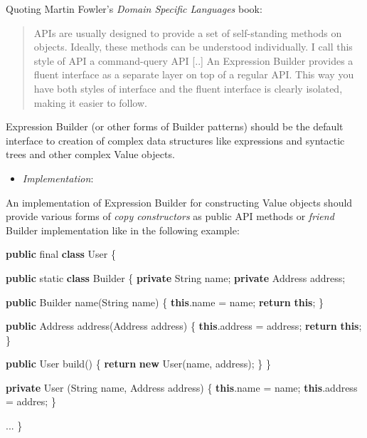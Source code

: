 \documentclass[11pt,]{article}
\newenvironment{Shaded}{}{}
\newcommand{\KeywordTok}[1]{\textcolor[rgb]{0.00,0.44,0.13}{\textbf{{#1}}}}
\newcommand{\DataTypeTok}[1]{\textcolor[rgb]{0.56,0.13,0.00}{{#1}}}
\newcommand{\FunctionTok}[1]{\textcolor[rgb]{0.02,0.16,0.49}{{#1}}}
\newcommand{\NormalTok}[1]{{#1}}
\begin{document}
Quoting Martin Fowler's \emph{Domain Specific Languages} book:

\begin{quote}
APIs are usually designed to provide a set of self-standing methods on
objects. Ideally, these methods can be understood individually. I call
this style of API a command-query API {[}..{]} An Expression Builder
provides a fluent interface as a separate layer on top of a regular API.
This way you have both styles of interface and the fluent interface is
clearly isolated, making it easier to follow.
\end{quote}

Expression Builder (or other forms of Builder patterns) should be the
default interface to creation of complex data structures like
expressions and syntactic trees and other complex Value objects.

\begin{itemize}
\item
  \emph{Implementation}:
\end{itemize}

An implementation of Expression Builder for constructing Value objects
should provide various forms of \emph{copy constructors} as public API
methods or \emph{friend} Builder implementation like in the following
example:

\begin{Shaded}
\begin{Highlighting}[]
\KeywordTok{public} \DataTypeTok{final} \KeywordTok{class} \NormalTok{User \{}

   \KeywordTok{public} \DataTypeTok{static} \KeywordTok{class} \NormalTok{Builder \{}
       \KeywordTok{private} \NormalTok{String name;}
       \KeywordTok{private} \NormalTok{Address address;}
       
       \KeywordTok{public} \NormalTok{Builder }\FunctionTok{name}\NormalTok{(String name) \{}
          \KeywordTok{this}\NormalTok{.}\FunctionTok{name} \NormalTok{= name; }\KeywordTok{return} \KeywordTok{this}\NormalTok{;}
       \NormalTok{\}}
       
       \KeywordTok{public} \NormalTok{Address }\FunctionTok{address}\NormalTok{(Address address) \{}
          \KeywordTok{this}\NormalTok{.}\FunctionTok{address} \NormalTok{= address; }\KeywordTok{return} \KeywordTok{this}\NormalTok{;}
       \NormalTok{\}}
       
       \KeywordTok{public} \NormalTok{User }\FunctionTok{build}\NormalTok{() \{}
          \KeywordTok{return} \KeywordTok{new} \FunctionTok{User}\NormalTok{(name, address);}
       \NormalTok{\}}
   \NormalTok{\}}
   
   \KeywordTok{private} \FunctionTok{User} \NormalTok{(String name, Address address) \{}
      \KeywordTok{this}\NormalTok{.}\FunctionTok{name} \NormalTok{= name; }\KeywordTok{this}\NormalTok{.}\FunctionTok{address} \NormalTok{= addres;}
   \NormalTok{\}}
   
   \NormalTok{...}
\NormalTok{\}}
\end{Highlighting}
\end{Shaded}
\end{document}
